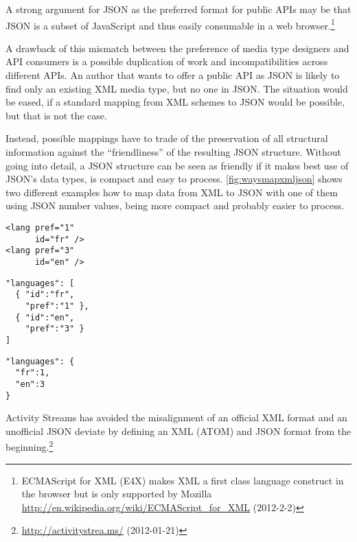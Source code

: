 \documentclass[12pt,a4paper]{scrartcl}		%
\newcommand{\citeurl}[2]{\url{#1} (#2)}
\begin{document}
A strong argument for JSON as the preferred format for public APIs may be that
JSON is a subset of JavaScript and thus easily consumable in a web
browser.\footnote{ECMAScript for XML (E4X) makes XML a first class language
  construct in the browser but is only supported by Mozilla
  \citeurl{http://en.wikipedia.org/wiki/ECMAScript_for_XML}{2012-2-2}}

A drawback of this mismatch between the preference of media type designers and
API consumers is a possible duplication of work and incompatibilities across
different APIs. An author that wants to offer a public API as JSON is likely to
find only an existing XML media type, but no one in JSON.  The situation would
be eased, if a standard mapping from XML schemes to JSON would be possible, but
that is not the case.

Instead, possible mappings have to trade of the preservation of all structural
information against the ``friendliness'' of the resulting JSON
structure.\cite{Boyer2011} Without going into detail, a JSON structure can be
seen as friendly if it makes best use of JSON's data types, is compact and easy
to process. \autoref{fig:waysmapxmljson} shows two different examples how to map
data from XML to JSON with one of them using JSON number values, being more
compact and probably easier to process.

\begin{multicols}{3}
\begin{lstlisting}[label=fig:waysmapxmljson,
                  captionpos=t,
                  caption={XML fragment}, frame=single]
<lang pref="1"
      id="fr" />
<lang pref="3"
      id="en" />
\end{lstlisting}
\columnbreak
\begin{lstlisting}[title={unfriendly JSON}, frame=single,
                  captionpos=t
]
"languages": [
  { "id":"fr",
    "pref":"1" },
  { "id":"en",
    "pref":"3" }
]
\end{lstlisting}
\columnbreak
\begin{lstlisting}[title={friendly JSON}, frame=single,
                  captionpos=t
]
"languages": {
  "fr":1,
  "en":3
}
\end{lstlisting}
\end{multicols}

Activity Streams has avoided the misalignment of an official XML format and an unofficial JSON deviate by defining an XML (ATOM) and JSON format from the beginning.\footnote{\citeurl{http://activitystrea.ms/}{2012-01-21}}
\end{document}
